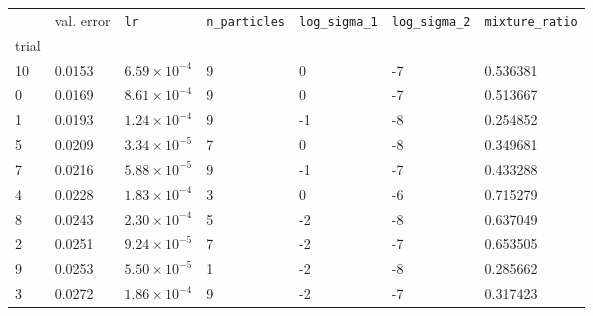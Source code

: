 \begin{tabular}{lp{2.3cm}p{2.3cm}p{2.3cm}p{2.3cm}p{2.3cm}p{2.3cm}}
\toprule
{} &  val. error &         \texttt{lr} &  \texttt{n\_particles} &  \texttt{log\_sigma\_1} &  \texttt{log\_sigma\_2} &  \texttt{mixture\_ratio} \\
trial &             &                     &                        &                         &                         &                          \\
\midrule
10    &      0.0153 & $6.59\times10^{-4}$ &                      9 &                       0 &                      -7 &                 0.536381 \\
0     &      0.0169 & $8.61\times10^{-4}$ &                      9 &                       0 &                      -7 &                 0.513667 \\
1     &      0.0193 & $1.24\times10^{-4}$ &                      9 &                      -1 &                      -8 &                 0.254852 \\
5     &      0.0209 & $3.34\times10^{-5}$ &                      7 &                       0 &                      -8 &                 0.349681 \\
7     &      0.0216 & $5.88\times10^{-5}$ &                      9 &                      -1 &                      -7 &                 0.433288 \\
4     &      0.0228 & $1.83\times10^{-4}$ &                      3 &                       0 &                      -6 &                 0.715279 \\
8     &      0.0243 & $2.30\times10^{-4}$ &                      5 &                      -2 &                      -8 &                 0.637049 \\
2     &      0.0251 & $9.24\times10^{-5}$ &                      7 &                      -2 &                      -7 &                 0.653505 \\
9     &      0.0253 & $5.50\times10^{-5}$ &                      1 &                      -2 &                      -8 &                 0.285662 \\
3     &      0.0272 & $1.86\times10^{-4}$ &                      9 &                      -2 &                      -7 &                 0.317423 \\
\bottomrule
\end{tabular}
